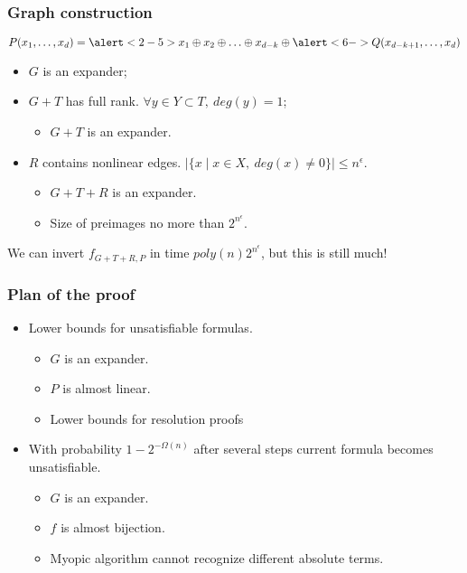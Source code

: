 \begin{frame}
    \frametitle{Graph construction}

    $P(x_1, \ldots, x_d) = \alert<2-5>{x_1 \oplus x_2 \oplus \ldots \oplus x_{d - k}} \oplus 
	\alert<6->{Q(x_{d - k + 1}, \ldots, x_d)}$
    
    \pause
    

    \begin{itemize}
	    \item $G$ is an expander;
   		\pause
        \pause
        \item $G + T$ has full rank. $\forall y \in Y \subset T, ~
		    deg(y) = 1$;
        \pause
        \begin{itemize}
	        \item $G + T$ is an expander.
        \end{itemize}
        \pause
        \item $R$ contains nonlinear edges. $|\{x \mid x \in X, ~ deg(x)
		    \ne 0\}| \le n^{\epsilon}$.
        \begin{itemize}
	        \item $G + T + R$ is an expander.
        	\pause
            \item Size of preimages no more than
				$2^{n^{\epsilon}}$.
        \end{itemize}
    \end{itemize}
    We can invert $f_{G + T + R, P}$ in time $poly(n) 2^{n^{\epsilon}}$,
	but this is still much! 
\end{frame}

\begin{frame}
	\frametitle{Plan of the proof}

	\begin{itemize}	       
		\pause
		\item Lower bounds for unsatisfiable formulas.
			\pause
            \begin{itemize}
	            \item $G$ is an expander.
	            \item $P$ is almost linear.
	            \item Lower bounds for resolution proofs
            \end{itemize}
		\pause
		\item With probability $1 - 2^{-\Omega(n)}$ after several steps
		        current formula becomes unsatisfiable.
            \pause
            \begin{itemize}
	            \item $G$ is an expander.
	            \item $f$ is almost bijection.
	            \item Myopic algorithm cannot recognize different
		            absolute terms.
            \end{itemize}
	\end{itemize}
   
\end{frame}